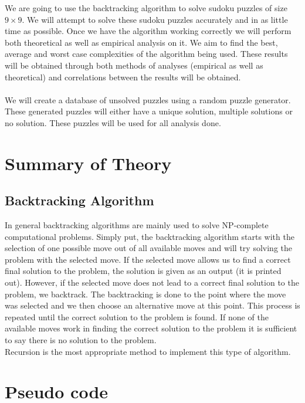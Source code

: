 \documentclass[12pt,a4paper,titlepage]{article}
\begin{document}
We are going to use the backtracking algorithm to solve sudoku puzzles of size $9\times 9$. We will attempt to solve these sudoku puzzles accurately and in as little time as possible. Once we have the algorithm working correctly we will perform both theoretical as well as empirical analysis on it. We aim to find the best, average and worst case complexities of the algorithm being used. These results will be obtained through both methods of analyses (empirical as well as theoretical) and correlations between the results will be obtained.
\\
\\
We will create a database of unsolved puzzles using a random puzzle generator. These generated puzzles will either have a unique solution, multiple solutions or no solution. These puzzles will be used for all analysis done. 
\\

\section{Summary of Theory}

\subsection{Backtracking Algorithm}

In general backtracking algorithms are mainly used to solve NP-complete computational problems. Simply put, the backtracking algorithm starts with the selection of one possible move out of all available moves and will try solving the problem with the selected move. If the selected move allows us to find a correct final solution to the problem, the solution is given as an output (it is printed out). However, if the selected move does not lead to a correct final solution to the problem, we backtrack. The backtracking is done to the point where the move was selected and we then choose an alternative move at this point. This process is repeated until the correct solution to the problem is found. If none of the available moves work in finding the correct solution to the problem it is sufficient to say there is no solution to the problem.
\\
Recursion is the most appropriate method to implement this type of algorithm.


\section{Pseudo code}
\end{document}
